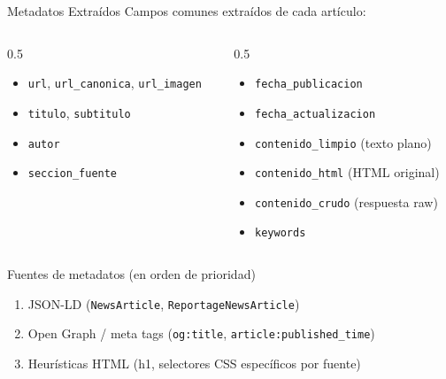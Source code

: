 \documentclass[11pt,aspectratio=169,spanish]{beamer}
\begin{document}
\begin{frame}[fragile]{Metadatos Extraídos}
    Campos comunes extraídos de cada artículo:

    \begin{columns}[T]
        \begin{column}{0.5\textwidth}
            \begin{itemize}
                \item \texttt{url}, \texttt{url\_canonica}, \texttt{url\_imagen}
                \item \texttt{titulo}, \texttt{subtitulo}
                \item \texttt{autor}
                \item \texttt{seccion\_fuente}
            \end{itemize}
        \end{column}
        \begin{column}{0.5\textwidth}
            \begin{itemize}
                \item \texttt{fecha\_publicacion}
                \item \texttt{fecha\_actualizacion}
                \item \texttt{contenido\_limpio} (texto plano)
                \item \texttt{contenido\_html} (HTML original)
                \item \texttt{contenido\_crudo} (respuesta raw)
                \item \texttt{keywords}
            \end{itemize}
        \end{column}
    \end{columns}

    \vspace{0.3cm}
    \begin{block}{Fuentes de metadatos (en orden de prioridad)}
        \begin{enumerate}
            \item JSON-LD (\texttt{NewsArticle}, \texttt{ReportageNewsArticle})
            \item Open Graph / meta tags (\texttt{og:title}, \texttt{article:published\_time})
            \item Heurísticas HTML (h1, selectores CSS específicos por fuente)
        \end{enumerate}
    \end{block}
\end{frame}
\end{document}
